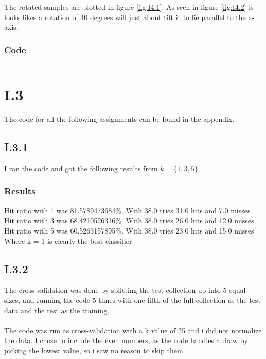 \documentclass{article}
\begin{document}
The rotated samples are plotted in figure \ref{fig:I4.1}. As seen in
figure \ref{fig:I4.2} is looks likes a rotation of 40 degrees will just
about tilt it to lie parallel to the x-axis.



\subsubsection{Code}

\inputminted{matlab}{part1/i24john.m}


\section{I.3}

The code for all the following assignments can be found in the appendix.

\subsection{I.3.1}
I ran the code and got the following results from $k = \{1,3,5\}$\\
\subsubsection*{Results}
Hit ratio with 1 was {\color{green}81.5789473684\%}. With 38.0 tries 31.0 hits and 7.0 misses\\
Hit ratio with 3 was {\color{yellow}68.4210526316\%}. With 38.0 tries 26.0 hits and 12.0 misses\\
Hit ratio with 5 was {\color{yellow}60.5263157895\%}. With 38.0 tries 23.0 hits and 15.0 misses\\
Where k = 1 is clearly the best classifier.\\

\subsection{I.3.2}
The cross-validation was done by splitting the test collection up into 5 equal sizes, and running the code 5 times with one fifth
of the full collection as the test data and the rest as the training.\\\\
The code was run as cross-validation with a k value of 25 and i did not normalize the data. I chose to include the even numbers,
 as the code handles a draw by picking the lowest value, so i saw no reason to skip them.
\end{document}
